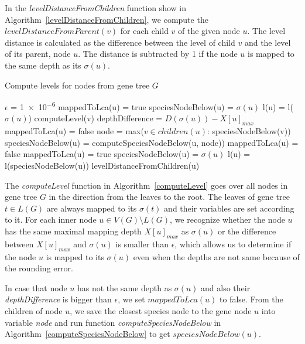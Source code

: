In the \emph{levelDistanceFromChildren} function show in Algorithm~\ref{levelDistanceFromChildren}, we compute the $levelDistanceFromParent(v)$ for each child $v$ of the given node $u$. The level distance is calculated as the difference between the level of child $v$ and the level of its parent, node $u$. The distance is subtracted by 1 if the node $u$ is mapped to the same depth as its $\sigma(u)$.

\begin{algorithm}
\caption{Compute levels for nodes from gene tree $G$} 
\label{computeLevel}
\begin{algorithmic}[1]
	\State $\epsilon$ = \num{1e-6}
		\State mappedToLca(u) = true
		\State speciesNodeBelow(u) = $\sigma(u)$
		\State l(u) = l($\sigma(u)$)
	\Else
			\State computeLevel(v)
		\EndFor
		\State depthDifference = $D(\sigma(u)) - X[u]_{max}$
			\State mappedToLca(u) = false
			\State node = max($v \in children(u)$: speciesNodeBelow(v))
			\State speciesNodeBelow(u) = computeSpeciesNodeBelow(u, node))
		\Else
				\State mappedToLca(u) = false
			\Else
				\State mappedToLca(u) = true
			\EndIf
			\State speciesNodeBelow(u) = $\sigma(u)$
		\EndIf
		\State l(u) = l(speciesNodeBelow(u))
		\State levelDistanceFromChildren(u)
	\EndIf
\EndFunction
\end{algorithmic}
\end{algorithm}

The \emph{computeLevel} function in Algorithm~\ref{computeLevel} goes over all nodes in gene tree $G$ in the direction from the leaves to the root. The leaves of gene tree $t \in L(G)$ are always mapped to its $\sigma(t)$ and their variables are set according to it. For each inner node $u \in V(G) \setminus L(G)$, we recognize whether the node $u$ has the same maximal mapping depth $X[u]_{max}$ as $\sigma(u)$ or the difference between $X[u]_{max}$ and $\sigma(u)$ is smaller than $\epsilon$, which allows us to determine if the node $u$ is mapped to its $\sigma(u)$ even when the depths are not same because of the rounding error.

In case that node $u$ has not the same depth as $\sigma(u)$ and also their \emph{depthDifference} is bigger than $\epsilon$, we set $mappedToLca(u)$ to false. From the children of node $u$, we save the closest species node to the gene node $u$ into variable \emph{node} and run function \emph{computeSpeciesNodeBelow} in Algorithm~\ref{computeSpeciesNodeBelow} to get $speciesNodeBelow(u)$. 

